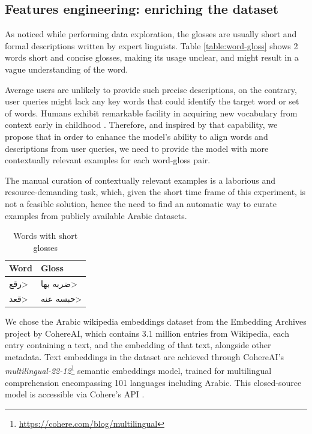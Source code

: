 \documentclass[12pt]{article}
\begin{document}
\subsection{Features engineering: enriching the dataset}

As noticed while performing data exploration, the glosses are usually short and formal descriptions written by expert linguists. Table \ref{table:word-gloss} shows 2 words short and concise glosses, making its usage unclear, and might result in a vague understanding of the word.

Average users are unlikely to provide such precise descriptions, on the contrary, user queries might lack any key words that could identify the target word or set of words. Humans exhibit remarkable facility in acquiring new vocabulary from context early in childhood \cite{killian1995}. Therefore, and inspired by that capability, we propose that in order to enhance the model’s ability to align words and descriptions from user queries, we need to provide the model with more contextually relevant examples for each word-gloss pair.

The manual curation of contextually relevant examples is a laborious and resource-demanding task, which, given the short time frame of this experiment, is not a feasible solution, hence the need to find an automatic way to curate examples from publicly available Arabic datasets.

\begin{table}
    \centering
    \caption{Words with short glosses}
    \label{table:word-short-gloss}
    \renewcommand{\arraystretch}{1.5}%
    \begin{tabularx}{\textwidth}{|X|X|}
        \hline
        \textbf{Word} & \textbf{Gloss} \\
        \hline
        \<رقع> & \<ضربه بها> \\
        \hline
        \<قعد> & \<حبسه عنه> \\
        \hline
    \end{tabularx}
\end{table}

We chose the Arabic wikipedia embeddings dataset from the Embedding Archives project by CohereAI, which contains 3.1 million entries from Wikipedia, each entry containing a text, and the embedding of that text, alongside other metadata. Text embeddings in the dataset are achieved through CohereAI's \textit{multilingual-22-12}\footnote{\href{https://cohere.com/blog/multilingual}{https://cohere.com/blog/multilingual}} semantic embeddings model, trained for multilingual comprehension encompassing 101 languages including Arabic. This closed-source model is accessible via Cohere's API \cite{Kamalloo2023}.
\end{document}
